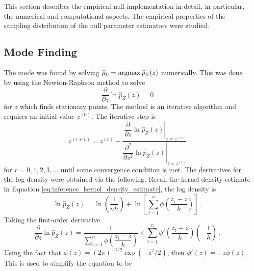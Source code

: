 This section describes the empirical null implementation in detail, in particular, the numerical and computational aspects. The empirical properties of the sampling distribution of the null parameter estimators were studied.

\subsection{Mode Finding}

The mode was found by solving $\widehat{\mu}_0 = \operatorname*{argmax}\widehat{p}_Z(z)$ numerically. This was done by using the Newton-Raphson method to solve
\begin{equation}
  \dfrac{
    \partial
  }
  {
    \partial z
  }
  \ln\widehat{p}_Z(z)
  = 0
\end{equation}
for $z$ which finds stationary points. The method is an iterative algorithm and requires an initial value $z^{(0)}$. The iterative step is
\begin{equation}
  z^{(r+1)} =
  z^{(r)}
  -\dfrac{
    \left.
      \dfrac{
        \partial
      }
      {
        \partial z
      }
      \ln\widehat{p}_Z(z)
    \right|_{z = z^{(r)}}
  }
  {
    \left.
      \dfrac{
        \partial^2
      }
      {
        \partial z^2
      }
      \ln\widehat{p}_Z(z)
    \right|_{z = z^{(r)}}
  } 
\end{equation}
for $r=0,1,2,3,\dotsc$ until some convergence condition is met. The derivatives for the log density were obtained via the following. Recall the kernel density estimate in Equation \eqref{eq:inference_kernel_density_estimate}, the log density is
\begin{equation}
  \ln\widehat{p}_Z(z)=
  \ln\left(
    \dfrac{1}{nh}
  \right)
  +
  \ln\left[
    \sum_{i=1}^n
    \phi\left(
      \dfrac{
        z_i - z
      }
      {
        h
      }
    \right)
  \right]
  \ .
\end{equation}
Taking the first-order derivative
\begin{equation*}
  \dfrac{
    \partial
  }
  {
    \partial z
  }
  \ln\widehat{p}_Z(z)
  =
  \dfrac{
    1
  }
  {
    \sum_{i=1}^n
    \phi\left(
      \dfrac{
        z_i - z
      }
      {
        h
      }
    \right)
  }
  \times
  \sum_{i=1}^n
  \phi'\left(
    \dfrac{
      z_i - z
    }
    {
      h
    }
  \right)
  \left(
    -\dfrac{
      1
    }
    {
      h
    }
  \right)
  \ .
\end{equation*}
Using the fact that $\phi(z)=(2\pi)^{-1/2}\exp(-z^2/2)$, then $\phi'(z)=-z\phi(z)$. This is used to simplify the equation to be
